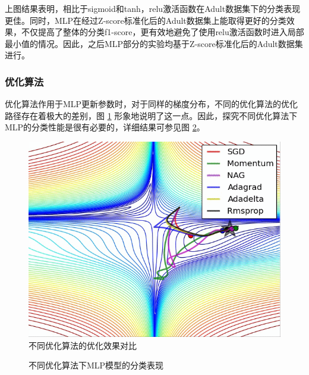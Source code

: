 \documentclass[12pt,a4paper]{article}
\theoremstyle{definition}
\begin{document}
上图结果表明，相比于sigmoid和tanh，relu激活函数在Adult数据集下的分类表现更佳。同时，MLP在经过Z-score标准化后的Adult数据集上能取得更好的分类效果，不仅提高了整体的分类f1-score，更有效地避免了使用relu激活函数时进入局部最小值的情况。因此，之后MLP部分的实验均基于Z-score标准化后的Adult数据集进行。

\subsubsection{优化算法}

优化算法作用于MLP更新参数时，对于同样的梯度分布，不同的优化算法的优化路径存在着极大的差别，图 \ref{fig:optim-ref} 形象地说明了这一点。因此，探究不同优化算法下MLP的分类性能是很有必要的，详细结果可参见图 \ref{fig:optim1}。

\begin{figure}[H]
	\centering
	\includegraphics[width=0.5\linewidth]{img/optim_example.png}
	\caption{不同优化算法的优化效果对比 \cite{optim_example}}
	\label{fig:optim-ref}
\end{figure}

\begin{figure}[H]
	\centering
	\caption{不同优化算法下MLP模型的分类表现}
	\label{fig:optim1}
\end{figure}
\end{document}
